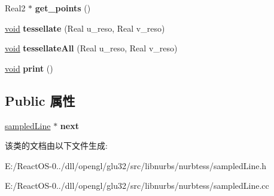 \begin{DoxyCompactItemize}
\item 
\mbox{\label{classsampled_line_a6b318dc90a6614c313ad301d3b1a2c0b}} 
Real2 $\ast$ {\bfseries get\+\_\+points} ()
\item 
\mbox{\label{classsampled_line_a6086c811057ae728d0a8aab13f5e2885}} 
\hyperlink{interfacevoid}{void} {\bfseries tessellate} (Real u\+\_\+reso, Real v\+\_\+reso)
\item 
\mbox{\label{classsampled_line_a4e1ad20619178054d84b0273737253ed}} 
\hyperlink{interfacevoid}{void} {\bfseries tessellate\+All} (Real u\+\_\+reso, Real v\+\_\+reso)
\item 
\mbox{\label{classsampled_line_a7fa792ed513eae7303c57c73c496ddf0}} 
\hyperlink{interfacevoid}{void} {\bfseries print} ()
\end{DoxyCompactItemize}
\subsection*{Public 属性}
\begin{DoxyCompactItemize}
\item 
\mbox{\label{classsampled_line_a25c17fd21a3d01a02972aba9be1bd2f1}} 
\hyperlink{classsampled_line}{sampled\+Line} $\ast$ {\bfseries next}
\end{DoxyCompactItemize}


该类的文档由以下文件生成\+:\begin{DoxyCompactItemize}
\item 
E\+:/\+React\+O\+S-\/0../dll/opengl/glu32/src/libnurbs/nurbtess/sampled\+Line.\+h\item 
E\+:/\+React\+O\+S-\/0../dll/opengl/glu32/src/libnurbs/nurbtess/sampled\+Line.\+cc\end{DoxyCompactItemize}
